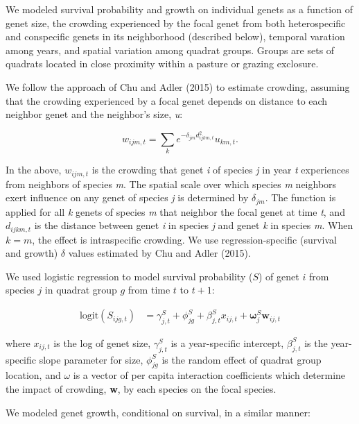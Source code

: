 \documentclass[12pt,]{article}
\begin{document}
We modeled survival probability and growth on individual genets as a
function of genet size, the crowding experienced by the focal genet from
both heterospecific and conspecific genets in its neighborhood
(described below), temporal varation among years, and spatial variation
among quadrat groups. Groups are sets of quadrats located in close
proximity within a pasture or grazing exclosure.

We follow the approach of Chu and Adler (2015) to estimate crowding,
assuming that the crowding experienced by a focal genet depends on
distance to each neighbor genet and the neighbor's size, \emph{u}:

\begin{equation}
w_{ijm,t} = \sum_k e^{-\delta_{jm}d_{ijkm,t}^{2}}u_{km,t}.
\end{equation}

In the above, \(w_{ijm,t}\) is the crowding that genet \emph{i} of
species \emph{j} in year \emph{t} experiences from neighbors of species
\emph{m}. The spatial scale over which species \emph{m} neighbors exert
influence on any genet of species \emph{j} is determined by
\(\delta_{jm}\). The function is applied for all \emph{k} genets of
species \emph{m} that neighbor the focal genet at time \emph{t}, and
\(d_{ijkm,t}\) is the distance between genet \emph{i} in species
\emph{j} and genet \emph{k} in species \emph{m}. When \(k=m\), the
effect is intraspecific crowding. We use regression-specific (survival
and growth) \(\delta\) values estimated by Chu and Adler (2015).

We used logistic regression to model survival probability (\(S\)) of
genet \(i\) from species \(j\) in quadrat group \(g\) from time \(t\) to
\(t+1\):

\begin{align}
\text{logit}(S_{ijg,t}) &= \gamma^{S}_{j,t} + \phi^{S}_{jg} + \beta^{S}_{j,t}x_{ij,t} + \boldsymbol{\omega}^{S}_{j} \textbf{w}_{ij,t}
\end{align}

where \(x_{ij,t}\) is the log of genet size, \(\gamma^{S}_{j,t}\) is a
year-specific intercept, \(\beta^{S}_{j,t}\) is the year-specific slope
parameter for size, \(\phi^{S}_{jg}\) is the random effect of quadrat
group location, and \(\omega\) is a vector of per capita interaction
coefficients which determine the impact of crowding, \textbf{w}, by each
species on the focal species.

We modeled genet growth, conditional on survival, in a similar manner:
\end{document}
